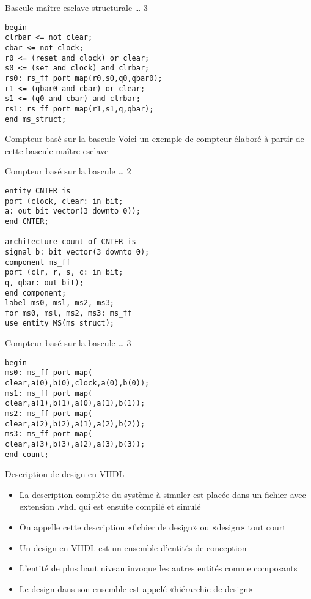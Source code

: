 \documentclass[presentation]{beamer}
\begin{document}
\begin{frame}[label={sec:orgaff556f},fragile]{Bascule maître-esclave structurale \ldots{} 3}
 \begin{verbatim}
begin
clrbar <= not clear;
cbar <= not clock;
r0 <= (reset and clock) or clear;
s0 <= (set and clock) and clrbar;
rs0: rs_ff port map(r0,s0,q0,qbar0);
r1 <= (qbar0 and cbar) or clear;
s1 <= (q0 and cbar) and clrbar;
rs1: rs_ff port map(r1,s1,q,qbar);
end ms_struct;
\end{verbatim}
\end{frame}

\begin{frame}[label={sec:org13e46d0}]{Compteur basé sur la bascule}
Voici un exemple de compteur élaboré à partir de cette bascule maître-esclave
\end{frame}

\begin{frame}[label={sec:orgb92c5a3},fragile]{Compteur basé sur la bascule \ldots{} 2}
 \begin{verbatim}
entity CNTER is
port (clock, clear: in bit;
a: out bit_vector(3 downto 0));
end CNTER;

architecture count of CNTER is
signal b: bit_vector(3 downto 0);
component ms_ff
port (clr, r, s, c: in bit;
q, qbar: out bit);
end component;
label ms0, msl, ms2, ms3;
for ms0, msl, ms2, ms3: ms_ff
use entity MS(ms_struct);
\end{verbatim}
\end{frame}

\begin{frame}[label={sec:orgf8aa4af},fragile]{Compteur basé sur la bascule \ldots{} 3}
 \begin{verbatim}
begin
ms0: ms_ff port map(
clear,a(0),b(0),clock,a(0),b(0));
ms1: ms_ff port map(
clear,a(1),b(1),a(0),a(1),b(1));
ms2: ms_ff port map(
clear,a(2),b(2),a(1),a(2),b(2));
ms3: ms_ff port map(
clear,a(3),b(3),a(2),a(3),b(3));
end count;
\end{verbatim}
\end{frame}


\begin{frame}[label={sec:org34367ce}]{Description de design en VHDL}
\begin{itemize}
\item La description complète du système à simuler est placée dans un fichier avec extension .vhdl qui est ensuite compilé et simulé
\item On appelle cette description «fichier de design» ou «design» tout court
\item Un design en VHDL est un ensemble d'entités de conception
\item L'entité de plus haut niveau invoque les autres entités comme composants
\item Le design dans son ensemble est appelé «hiérarchie de design»
\end{itemize}
\end{frame}
\end{document}
